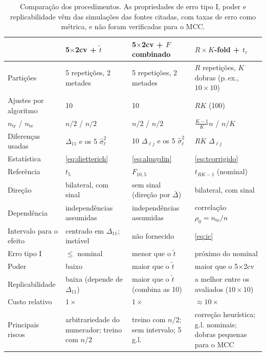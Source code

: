 \documentclass[11pt,a4paper]{article}
\newcommand{\tr}{\mathrm{tr}}
\newcommand{\te}{\mathrm{te}}
\begin{document}
\begin{table}[htbp]
\centering\small
\caption{Comparação dos procedimentos. As propriedades de erro tipo I, poder e
replicabilidade vêm das simulações das fontes citadas, com taxas de erro como
métrica, e não foram verificadas para o MCC.}
\label{tab:comparativa}
\renewcommand{\arraystretch}{1.12}
\begin{tabularx}{\textwidth}{@{}>{\raggedright\arraybackslash}p{2.9cm} L L L@{}}
\toprule
 & 5$\times$2cv + $\tilde t$ \citep{dietterich1998approximate} & 5$\times$2cv + $F$ combinado \citep{alpaydin1999combined} & $R\times K$-fold + $t_c$ \citep{nadeau2003inference,bouckaert2004replicability} \\
\midrule
Partições & 5 repetições, 2 metades & 5 repetições, 2 metades & $R$ repetições, $K$ dobras (p.\,ex., $10\times10$) \\
Ajustes por algoritmo & 10 & 10 & $RK$ (100) \\
$n_{\tr}$ / $n_{\te}$ & $n/2$ / $n/2$ & $n/2$ / $n/2$ & $\tfrac{K-1}{K}n$ / $n/K$ \\
Diferenças usadas & $\Delta_{11}$ e os 5 $\hat\sigma_\ell^2$ & 10 $\Delta_{\ell j}$ e os 5 $\hat\sigma_\ell^2$ & $RK$ $\Delta_{\ell j}$ \\
Estatística & \eqref{eq:dietterich} & \eqref{eq:alpaydin} & \eqref{eq:tcorrigido} \\
Referência & $t_5$ & $F_{10,5}$ & $t_{RK-1}$ (nominal) \\
Direção & bilateral, com sinal & sem sinal (direção por $\bar\Delta$) & bilateral, com sinal \\
Dependência & independências assumidas & independências assumidas & correlação $\rho_0=n_{\te}/n$ \\
Intervalo para o efeito & centrado em $\Delta_{11}$; instável & não fornecido & \eqref{eq:ic} \\
Erro tipo I & $\le$ nominal & menor que o $\tilde t$ & próximo do nominal \\
Poder & baixo & maior que o $\tilde t$ & maior que o 5$\times$2cv \\
Replicabilidade & baixa (depende de $\Delta_{11}$) & maior que o $\tilde t$ (combina as 10) & a melhor entre os avaliados ($10\times10$) \\
Custo relativo & $1\times$ & $1\times$ & $\approx10\times$ \\
Principais riscos & arbitrariedade do numerador; treino com $n/2$ & treino com $n/2$; sem intervalo; 5 g.l. & correção heurística; g.l. nominais; dobras pequenas para o MCC \\
\bottomrule
\end{tabularx}
\end{table}
\end{document}
